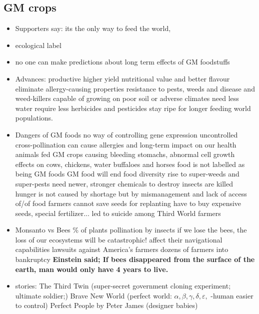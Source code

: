 \documentclass[a5paper,12pt,twoside,titlepage]{scrartcl}
\begin{document}
		\subsection{GM crops}
		\begin{itemize}
			\item Supporters say: its the only way to feed the world, 
			\item ecological label
			\item no one can make predictions about long term effects of GM foodstuffs
			\item Advances:
			\subitem productive \textrightarrow higher yield
			\subitem nutritional value and better flavour
			\subitem eliminate allergy-causing properties
			\subitem resistance to pests, weeds and disease and weed-killers
			\subitem capable of growing on poor soil or adverse climates
			\subitem need less water
			\subitem require less herbicides and pesticides
			\subitem stay ripe for longer
			\subitem feeding world populations.
			\item Dangers of GM foods
			\subitem no way of controlling gene expression
			\subitem uncontrolled cross-pollination 
			\subitem can cause allergies and long-term impact on our health
			\subitem animals fed GM crops \textrightarrow causing bleeding stomachs, abnormal cell growth
			\subitem effects on cows, chickens, water buffaloes and horses
			\subitem food is not labelled as being GM foods
			\subitem GM food will end food diversity 
			\subitem rise to super-weeds and super-pests \textrightarrow need newer, stronger chemicals to destroy
			\subitem insects are killed
			\subitem hunger is not caused by shortage but by mismanagement and lack of access of/of food
			\subitem farmers cannot save seeds for replanting
			\subitem \textrightarrow have to buy expensive seeds, special fertilizer...
			\subitem \textrightarrow led to suicide among Third World farmers
			\item Monsanto vs Bees
			\% of plants pollination by insects
			\subitem if we lose the bees, the loss of our ecosystems will be catastrophic!
			\subitem affect their navigational capabilities
			 lawsuits against America's farmers \textrightarrow dozens of farmers into bankruptcy
			\subitem \textbf{Einstein said; \glqq If bees disappeared from the surface of the earth, man would only have 4 years to live.\grqq}
			\item stories:
			\subitem The Third Twin (super-secret government cloning experiment; ultimate soldier;)
			\subitem Brave New World (perfect world: $\alpha, \beta, \gamma, \delta, \varepsilon,$ -human \textrightarrow easier to control)
			\subitem Perfect People by Peter James (designer babies)
			\end{itemize}
\end{document}
